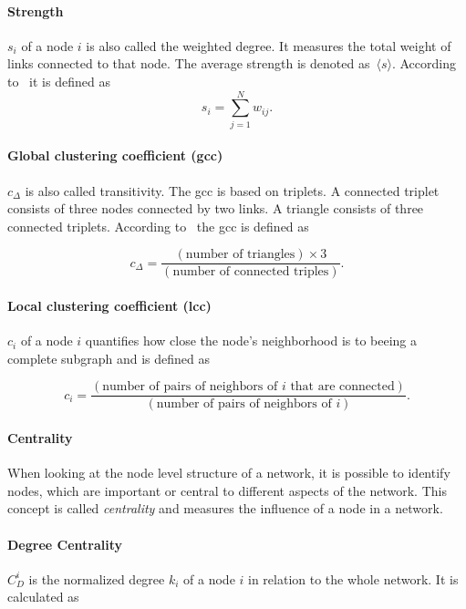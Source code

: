 \paragraph{Strength} $s_i$ of a node $i$ is also called the weighted degree.
It measures the total weight of links connected to that node.
The average strength is denoted as~$\langle s \rangle$.
According to~\textcite{barrat2004architecture} it is defined as
\begin{equation}
\label{eq:strength}
s_i = \sum_{j=1}^{N}w_{ij}. 
\end{equation}

\paragraph{Global clustering coefficient (gcc)} $c_\Delta$ is also called transitivity. The gcc is based on triplets. A connected triplet consists of three nodes connected by two links. A triangle consists of three connected triplets. 
 According to~\textcite{wasserman1994social} the gcc is defined as
 
\begin{equation}
\label{eq:gcc}
c_\Delta = \frac{(\text{number of triangles}) \times 3}{(\text{number of connected triples})}.
\end{equation}

\paragraph{Local clustering coefficient (lcc)} $c_i$ of a node $i$ quantifies how close the node's neighborhood is to beeing a complete subgraph and is defined as

\begin{equation}
\label{eq:lcc}
c_i = \frac{(\text{number of pairs of neighbors of }i\text{ that are connected})}{(\text{number of pairs of neighbors of }i)}.
\end{equation}

\paragraph{Centrality}
When looking at the node level structure of a network, it is possible to identify nodes, which are important or central to different aspects of the network. This concept is called \emph{centrality} and measures the influence of a node in a network.

\paragraph{Degree Centrality}
$C^i_D$ is the normalized degree $k_i$ of a node $i$ in relation to the whole network. It is calculated as

